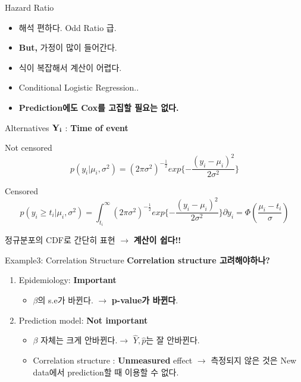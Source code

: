 \documentclass{beamer}
\begin{document}
\begin{frame}{Hazard Ratio}
\begin{itemize}
\item 해석 편하다. Odd Ratio 급. 
\item \textbf{But, } 가정이 많이 들어간다. 
\item 식이 복잡해서 계산이 어렵다. 
\item Conditional Logistic Regression.. 
\item \textbf{Prediction에도 Cox를 고집할 필요는 없다.}
\end{itemize}
\end{frame}

\begin{frame}{Alternatives}
$\bf{Y_i}$ : \textbf{Time of event}
\begin{block}{Not censored}
\begin{equation*}
p(y_i|\mu_i,\sigma^2)=(2\pi\sigma^2)^{-\frac{1}{2}}exp{\{-\frac{(y_i-\mu_i)^2}{2\sigma^2}\}}
\end{equation*}
\end{block}

\begin{block}{Censored}
\begin{equation*}
p(y_i\ge t_i|\mu_i,\sigma^2)=\int_{t_i}^{\infty}(2\pi\sigma^2)^{-\frac{1}{2}}exp{\{-\frac{(y_i-\mu_i)^2}{2\sigma^2}\}}\partial y_i=\Phi{(\frac{\mu_i-t_i}{\sigma})}
\end{equation*}
\end{block}
정규분포의 CDF로 간단히 표현 $\rightarrow$ \textbf{계산이 쉽다!!} 
\end{frame}

\begin{frame}{Example3: Correlation Structure}
\textbf{Correlation structure 고려해야하나?} 
\begin{enumerate}
\item Epidemiology: \textbf{Important}
 \begin{itemize}
  \item $\beta$의 s.e가 바뀐다. $\rightarrow$ \textbf{p-value가 바뀐다}.
 \end{itemize}
\item Prediction model: \textbf{Not important}
 \begin{itemize}
  \item $\beta$ 자체는 크게 안바뀐다.$\rightarrow$ $\hat{Y}, \hat{p}$는 잘 안바뀐다.  
  \item Correlation structure : \textbf{Unmeasured} effect $\rightarrow$ 측정되지 않은 것은 New data에서 prediction할 때 이용할 수 없다.  
 \end{itemize}
\end{enumerate}
\end{frame}
\end{document}

